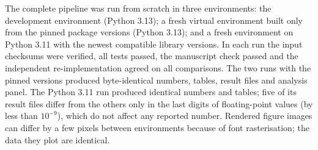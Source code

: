 The complete pipeline was run from scratch in three environments: the development environment (Python 3.13); a fresh virtual environment built only from the pinned package versions (Python 3.13); and a fresh environment on Python 3.11 with the newest compatible library versions. In each run the input checksums were verified, all tests passed, the manuscript check passed and the independent re-implementation agreed on all comparisons. The two runs with the pinned versions produced byte-identical numbers, tables, result files and analysis panel. The Python 3.11 run produced identical numbers and tables; five of its result files differ from the others only in the last digits of floating-point values (by less than $10^{-9}$), which do not affect any reported number. Rendered figure images can differ by a few pixels between environments because of font rasterisation; the data they plot are identical.
